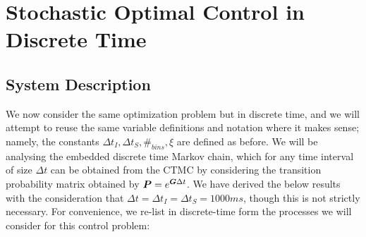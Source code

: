 \chapter{Stochastic Optimal Control in Discrete Time}

\section{System Description}
We now consider the same optimization problem but in discrete time, and we will attempt to reuse the same variable definitions and notation where it makes sense; namely, the constants $\Delta {t_{I}}, \Delta {t_{S}}, \#_{bins}, \xi$ are defined as before. We will be analysing the embedded discrete time Markov chain, which for any time interval of size $
\Delta t$ can be obtained from the CTMC by considering the transition probability matrix obtained by $\boldsymbol{P} = e^{\boldsymbol{G}\Delta t}$. We have derived the below results with the consideration that $\Delta t = \Delta {t_{I}} = \Delta {t_{S}} = 1000ms$, though this is not strictly necessary. For convenience, we re-list in discrete-time form the processes we will consider for this control problem:

